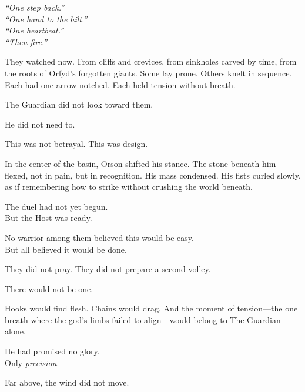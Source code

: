 \documentclass[9pt]{article}
\begin{document}
\vspace{0.5em}
\textit{``One step back.''}\\
\textit{``One hand to the hilt.''}\\
\textit{``One heartbeat.''}\\
\textit{``Then fire.''}

\vspace{0.5em}
They watched now. From cliffs and crevices, from sinkholes carved by time, from the roots of Orfyd’s forgotten giants. Some lay prone. Others knelt in sequence. Each had one arrow notched. Each held tension without breath.

\vspace{0.5em}
The Guardian did not look toward them.

\vspace{0.5em}
He did not need to.

\vspace{0.5em}
This was not betrayal. This was design.

\vspace{0.5em}
In the center of the basin, Orson shifted his stance. The stone beneath him flexed, not in pain, but in recognition. His mass condensed. His fists curled slowly, as if remembering how to strike without crushing the world beneath.

\vspace{0.5em}
The duel had not yet begun.\\
But the Host was ready.

\vspace{0.5em}
No warrior among them believed this would be easy.\\
But all believed it would be done.

\vspace{0.5em}
They did not pray. They did not prepare a second volley.

\vspace{0.5em}
There would not be one.

\vspace{0.5em}
Hooks would find flesh. Chains would drag. And the moment of tension---the one breath where the god’s limbs failed to align---would belong to The Guardian alone.

\vspace{0.5em}
He had promised no glory.\\
Only \textit{precision}.

\vspace{0.5em}
Far above, the wind did not move.
\end{document}

